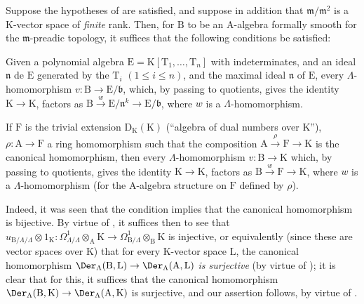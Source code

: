 \begin{remark}[22.1.3]
\label{0.22.1.3}
Suppose the hypotheses of  are satisfied, and suppose in addition that $\mathfrak{m}/\mathfrak{m}^2$ is a $\mathrm{K}$-vector space of \emph{finite} rank.
Then, for $\mathrm{B}$ to be an $\mathrm{A}$-algebra formally smooth for the $\mathfrak{m}$-preadic topology, it suffices that the following conditions be satisfied:

\begin{env}[22.1.3.1]
\label{0.22.1.3.1}
Given a polynomial algebra $\mathrm{E}=\mathrm{K}[\mathrm{T}_1,\ldots,\mathrm{T}_n]$ with indeterminates, and an ideal $\mathfrak{n}$ de $\mathrm{E}$ generated by the $\mathrm{T}_i$ $(1\leq i\leq n)$, and the maximal ideal $\mathfrak{n}$ of $\mathrm{E}$, every $\Lambda$-homomorphism $v:\mathrm{B}\to\mathrm{E}/\mathfrak{b}$, which, by passing to quotients, gives the identity $\mathrm{K}\to\mathrm{K}$, factors as $\mathrm{B}\xrightarrow{w}\mathrm{E}/\mathfrak{n}^k\to\mathrm{E}/\mathfrak{b}$, where $w$ is a $\Lambda$-homomorphism.
\end{env}

\begin{env}[22.1.3.2]
\label{0.22.1.3.2}
If $\mathrm{F}$ is the trivial extension $\mathrm{D}_\mathrm{K}(\mathrm{K})$ (``algebra of dual numbers over $\mathrm{K}$''), $\rho:\mathrm{A}\to\mathrm{F}$ a ring homomorphism such that the composition $\mathrm{A}\xrightarrow{\rho}\mathrm{F}\to\mathrm{K}$ is the canonical homomorphism, then every $\Lambda$-homomorphism $v:\mathrm{B}\to\mathrm{K}$ which, by passing to quotients, gives the identity $\mathrm{K}\to\mathrm{K}$, factors as $\mathrm{B}\xrightarrow{w}\mathrm{F}\to\mathrm{K}$, where $w$ is a $\Lambda$-homomorphism (for the $\mathrm{A}$-algebra structure on $\mathrm{F}$ defined by $\rho$).
\end{env}

Indeed, it was seen  that the condition  implies that the canonical homomorphism  is bijective.
By virtue of , it suffices then to see that $u_{\mathrm{B}/\Lambda/\Lambda}\otimes 1_\mathrm{K}:\Omega^1_{\Lambda/\Lambda}\otimes_\mathrm{A}\mathrm{K}\to\Omega^1_{\mathrm{B}/\Lambda}\otimes_\mathrm{B}\mathrm{K}$ is injective, or equivalently (since these are vector spaces over $\mathrm{K}$) that for every $\mathrm{K}$-vector space $\mathrm{L}$, the canonical homomorphism $\Der_\Lambda(\mathrm{B},\mathrm{L})\to\Der_\Lambda(\mathrm{A},\mathrm{L})$ \emph{is surjective} (by virtue of ); it is clear that for this, it suffices that the canonical homomorphism $\Der_\Lambda(\mathrm{B},\mathrm{K})\to\Der_\Lambda(\mathrm{A},\mathrm{K})$ is surjective, and our assertion follows, by virtue of .


\end{remark}
